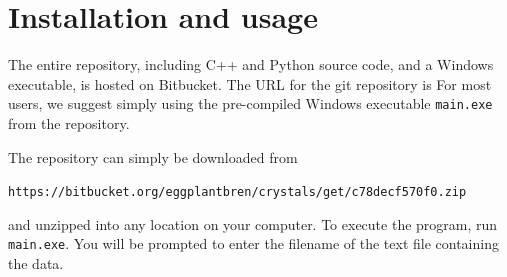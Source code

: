 \documentclass[a4paper, 12pt]{elsarticle}
\begin{document}
\section{Installation and usage}

The entire repository, including C++ and Python source code, and a Windows
executable, is hosted on Bitbucket. The URL for the git repository is
For most users, we suggest simply using the pre-compiled Windows executable
{\tt main.exe} from the repository.

The repository can simply be downloaded from

{\tt https://bitbucket.org/eggplantbren/crystals/get/c78decf570f0.zip}

and unzipped into any location on your computer. To execute the program,
run {\tt main.exe}. You will be prompted to enter the filename of the text
file containing the data.




\end{document}
